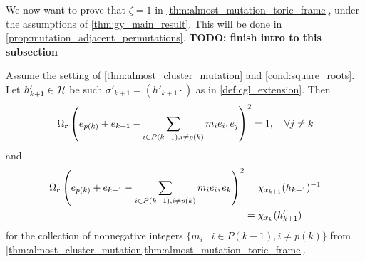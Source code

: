 We now want to prove that $\zeta = 1$ in \cref{thm:almost_mutation_toric_frame}, under
the assumptions of \cref{thm:gy_main_result}. This will be done in
\cref{prop:mutation_adjacent_permutations}. \textbf{TODO: finish intro to this subsection}

\begin{theorem}

	Assume the setting of \cref{thm:almost_cluster_mutation} and \cref{cond:square_roots}. Let $h'_{k+1} \in \mathcal{H}$ be such $\sigma'_{k+1} = (h'_{k+1}\cdot)$ as in \cref{def:cgl_extension}. Then
	\begin{equation}  \label{eq:Omega_r_squared_one}
		\Omega_{\mathbf{r}}\left(e_{p(k)} + e_{k+1} - \sum_{i \in P(k-1), i\neq p(k)} m_i e_i, e_j\right)^2  = 1, \quad \forall j \neq k
	\end{equation}
	and
	\begin{equation}\label{eq:Omega_r_squared_ek}
		\begin{aligned}
			\Omega_{\mathbf{r}}\left(e_{p(k)} + e_{k+1} - \sum_{i \in P(k-1), i\neq p(k)}m_i e_i, e_k\right)^2 & = \chi_{x_{k+1}}(h_{k+1})^{-1} \\
			                                                                                             & = \chi_{x_k}(h'_{k+1})
		\end{aligned}
	\end{equation}
	for the collection of nonnegative integers $\{m_i \mid i \in P(k-1), i\neq p(k)\}$ from
	\cref{thm:almost_cluster_mutation,thm:almost_mutation_toric_frame}.

\end{theorem}

